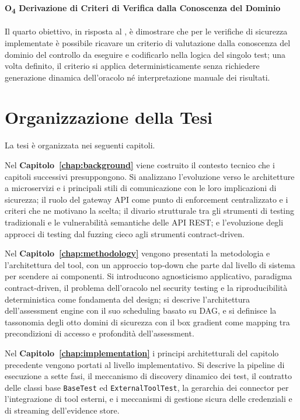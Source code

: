 \paragraph{O\textsubscript{4} Derivazione di Criteri di Verifica dalla Conoscenza del Dominio}\label{o4:oracoli-dominio}
Il quarto obiettivo, in risposta al , è dimostrare che per le verifiche di sicurezza implementate è possibile ricavare un criterio di valutazione dalla conoscenza del dominio del controllo da eseguire e codificarlo nella logica del singolo test; una volta definito, il criterio si applica deterministicamente senza richiedere generazione dinamica dell'oracolo né interpretazione manuale dei risultati.

\section{Organizzazione della Tesi}\label{sec:organizzazione}

La tesi è organizzata nei seguenti capitoli.

Nel \textbf{Capitolo~\ref{chap:background}} viene costruito il contesto tecnico che i capitoli successivi presuppongono. Si analizzano l'evoluzione verso le architetture a microservizi e i principali stili di comunicazione con le loro implicazioni di sicurezza; il ruolo del gateway \gls{API} come punto di enforcement centralizzato e i criteri che ne motivano la scelta; il divario strutturale tra gli strumenti di testing tradizionali e le vulnerabilità semantiche delle \gls{API} REST; e l'evoluzione degli approcci di testing dal fuzzing cieco agli strumenti contract-driven.

Nel \textbf{Capitolo~\ref{chap:methodology}} vengono presentati la metodologia e l'architettura del tool, con un approccio top-down che parte dal livello di sistema per scendere ai componenti. Si introducono agnosticismo applicativo, paradigma contract-driven, il problema dell'oracolo nel security testing e la riproducibilità deterministica come fondamenta del design; si descrive l'architettura dell'assessment engine con il suo scheduling basato su \gls{DAG}, e si definisce la tassonomia degli otto domini di sicurezza con il box gradient come mapping tra precondizioni di accesso e profondità dell'assessment.

Nel \textbf{Capitolo~\ref{chap:implementation}} i principi architetturali del capitolo precedente vengono portati al livello implementativo. Si descrive la pipeline di esecuzione a sette fasi, il meccanismo di discovery dinamico dei test, il contratto delle classi base \texttt{BaseTest} ed \texttt{ExternalToolTest}, la gerarchia dei connector per l'integrazione di tool esterni, e i meccanismi di gestione sicura delle credenziali e di streaming dell'evidence store.

